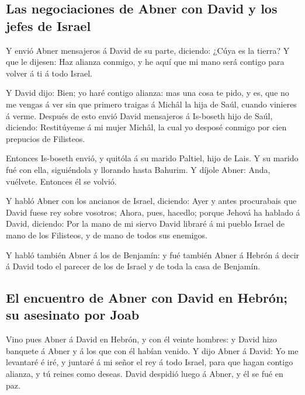 \hypertarget{las-negociaciones-de-abner-con-david-y-los-jefes-de-israel}{%
\subsection{Las negociaciones de Abner con David y los jefes de
Israel}\label{las-negociaciones-de-abner-con-david-y-los-jefes-de-israel}}

 Y envió Abner mensajeros á David de su parte, diciendo:
¿Cúya es la tierra? Y que le dijesen: Haz alianza conmigo, y he aquí que
mi mano será contigo para volver á ti á todo Israel.

 Y David dijo: Bien; yo haré contigo alianza: mas una cosa
te pido, y es, que no me vengas á ver sin que primero traigas á Michâl
la hija de Saúl, cuando vinieres á verme.  Después de esto
envió David mensajeros á Is-boseth hijo de Saúl, diciendo: Restitúyeme á
mi mujer Michâl, la cual yo desposé conmigo por cien prepucios de
Filisteos.

 Entonces Is-boseth envió, y quitóla á su marido Paltiel,
hijo de Lais.  Y su marido fué con ella, siguiéndola y
llorando hasta Bahurim. Y díjole Abner: Anda, vuélvete. Entonces él se
volvió.

 Y habló Abner con los ancianos de Israel, diciendo: Ayer y
antes procurabais que David fuese rey sobre vosotros; 
Ahora, pues, hacedlo; porque Jehová ha hablado á David, diciendo: Por la
mano de mi siervo David libraré á mi pueblo Israel de mano de los
Filisteos, y de mano de todos sus enemigos.

 Y habló también Abner á los de Benjamín: y fué también
Abner á Hebrón á decir á David todo el parecer de los de Israel y de
toda la casa de Benjamín.

\hypertarget{el-encuentro-de-abner-con-david-en-hebruxf3n-su-asesinato-por-joab}{%
\subsection{El encuentro de Abner con David en Hebrón; su asesinato por
Joab}\label{el-encuentro-de-abner-con-david-en-hebruxf3n-su-asesinato-por-joab}}

 Vino pues Abner á David en Hebrón, y con él veinte
hombres: y David hizo banquete á Abner y á los que con él habían venido.
 Y dijo Abner á David: Yo me levantaré é iré, y juntaré á
mi señor el rey á todo Israel, para que hagan contigo alianza, y tú
reines como deseas. David despidió luego á Abner, y él se fué en paz.

